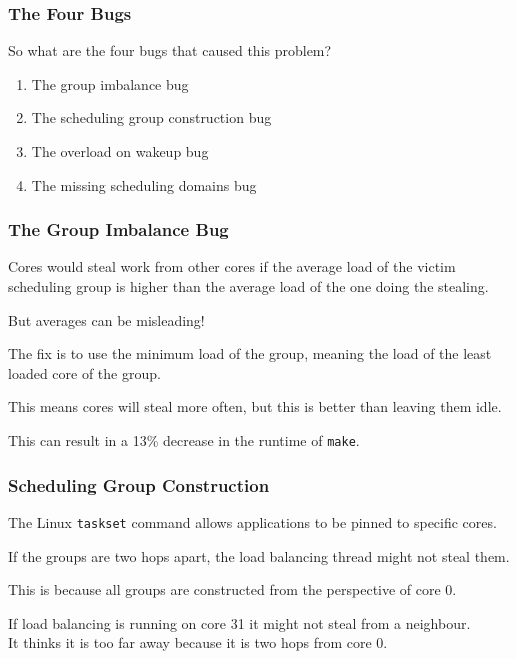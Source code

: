 \begin{frame}
\frametitle{The Four Bugs}

So what are the four bugs that caused this problem?
\begin{enumerate}
	\item The group imbalance bug
	\item The scheduling group construction bug
	\item The overload on wakeup bug
	\item The missing scheduling domains bug
\end{enumerate}

\end{frame}



\begin{frame}
\frametitle{The Group Imbalance Bug}

Cores would steal work from other cores if the average load of the victim scheduling group is higher than the average load of the one doing the stealing. 

But averages can be misleading! 

The fix is to use the minimum load of the group, meaning the load of the least loaded core of the group. 

This means cores will steal more often, but this is better than leaving them idle. 

This can result in a 13\% decrease in the runtime of \texttt{make}.

\end{frame}



\begin{frame}
\frametitle{Scheduling Group Construction}

The Linux \texttt{taskset} command allows applications to be pinned to specific cores. 

If the groups are two hops apart, the load balancing thread might not steal them. 

This is because all groups are constructed from the perspective of core 0. 

If load balancing is running on core 31 it might not steal from a neighbour.\\
\quad It thinks it is too far away because it is two hops from core 0.

\end{frame}



